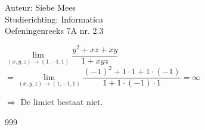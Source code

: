 \documentclass[a4paper]{article}
\begin{document}
  
\noindent \large Auteur: Siebe Mees \\
\noindent \large Studierichting: Informatica\\
\noindent \large Oefeningenreeks 7A nr. 2.3\\

\medskip

\normalsize

$ \lim\limits_{(x,y,z)\rightarrow(1,-1,1)} \dfrac{y^2+xz+xy}{1+xyz} $\\

$ = \lim\limits_{(x,y,z)\rightarrow(1,-1,1)} \dfrac{(-1)^2+1\cdot1+1\cdot(-1)}{1+1\cdot(-1)\cdot1} =\infty$ 

$ \Rightarrow $ De limiet bestaat niet. \\

\begin{thebibliography}{999}
\end{thebibliography}
\end{document}
